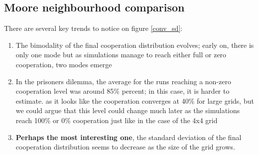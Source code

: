 \documentclass[a4paper]{article}
\begin{document}
\subsection{Moore neighbourhood comparison}
There are several key trends to notice on figure \ref{conv_sd}:
\begin{enumerate}
	\item The bimodality of the final cooperation distribution evolves; 
		early on, there is only one mode but as simulations manage to
		reach either full or zero cooperation, two modes emerge
	\item In the prisoners dilemma, the average for the runs reaching a
		non-zero cooperation level was around 85\% percent; in this
		case, it is harder to estimate. as it looks like the cooperation
		converges at 40\% for large grids, but we could argue that 
		this level could change much later as the simulations reach
		100\% or 0\% cooperation just like in the case of the 4x4 grid
	\item \textbf{Perhaps the most interesting one}, the standard 
		deviation of the final cooperation distribution seems to
		decrease as the size of the grid grows.
\end{enumerate}
\end{document}

